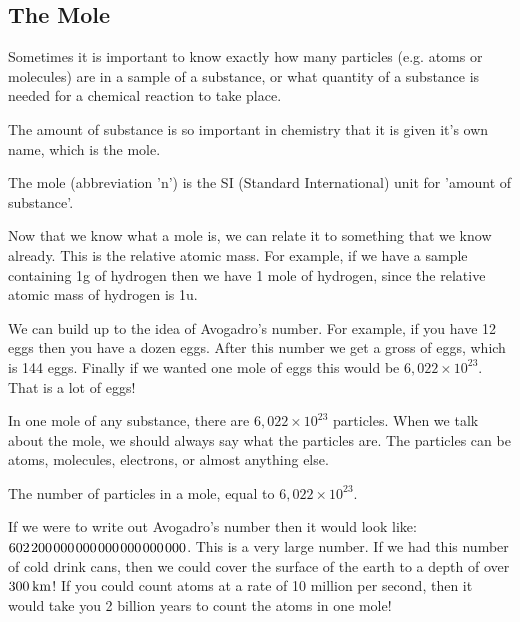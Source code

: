             \subsection{ The Mole}
            \nopagebreak
      \label{m38717*id275573}Sometimes it is important to know exactly how many particles (e.g. atoms or molecules) are in a sample of a substance, or what quantity of a substance is needed for a chemical reaction to take place.\par 
\label{m38717*eip-872}The amount of substance is so important in chemistry that it is given it's own name, which is the mole.  \par \label{m38717*fhsst!!!underscore!!!id119}
 { \label{m38717*meaningfhsst!!!underscore!!!id119}
      \label{m38717*id275969}The mole (abbreviation 'n') is the SI (Standard International) unit for 'amount of substance'. \par 
       } 
\label{m38717*eip-392}Now that we know what a mole is, we can relate it to something that we know already. This is the relative atomic mass. For example, if we have a sample containing 1g of hydrogen then we have 1 mole of hydrogen, since the relative atomic mass of hydrogen is 1u.\par \label{m38717*eip-503}We can build up to the idea of Avogadro's number. For example, if you have 12 eggs then you have a dozen eggs. After this number we get a gross of eggs, which is 144 eggs. Finally if we wanted one mole of eggs this would be $6,022\ensuremath{\times}{10}^{23}$. That is a lot of eggs!\par \label{m38717*eip-460}In one mole of any substance, there are $6,022\ensuremath{\times}{10}^{23}$ particles. When we talk about the mole, we should always say what the particles are. The particles can be atoms, molecules, electrons, or almost anything else.\par \label{m38717*fhsst!!!underscore!!!id123}
 { \label{m38717*meaningfhsst!!!underscore!!!id123}
      \label{m38717*id276010}The number of particles in a mole, equal to $6,022\ensuremath{\times}{10}^{23}$. \par 
       } 
\label{m38717*eip-446}If we were to write out Avogadro's number then it would look like:
$602\phantom{\rule{1pt}{0ex}}200\phantom{\rule{1pt}{0ex}}000\phantom{\rule{1pt}{0ex}}000\phantom{\rule{1pt}{0ex}}000\phantom{\rule{1pt}{0ex}}000\phantom{\rule{1pt}{0ex}}000\phantom{\rule{1pt}{0ex}}000$. This is a very large number. If we had this number of cold drink cans, then we could cover the surface of the earth to a depth of over $300\phantom{\rule{2pt}{0ex}}\mathrm{km}$! If you could count atoms at a rate of 10 million per second, then it would take you 2 billion years to count the atoms in one mole!\par \label{m38717*notfhsst!!!underscore!!!id126}
